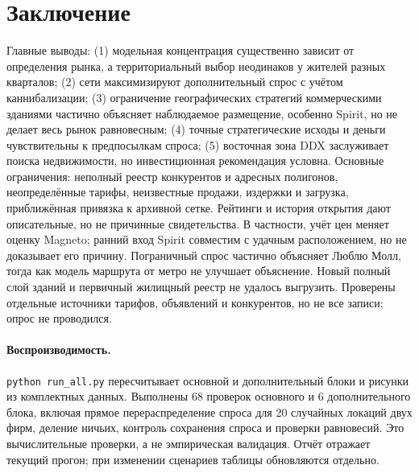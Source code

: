 \documentclass[12pt,a4paper]{article}
\begin{document}
\section{Заключение}
Главные выводы: (1) модельная концентрация существенно зависит от определения рынка, а территориальный выбор неодинаков у жителей разных кварталов; (2) сети максимизируют дополнительный спрос с учётом каннибализации; (3) ограничение географических стратегий коммерческими зданиями частично объясняет наблюдаемое размещение, особенно Spirit, но не делает весь рынок равновесным; (4) точные стратегические исходы и деньги чувствительны к предпосылкам спроса; (5) восточная зона DDX заслуживает поиска недвижимости, но инвестиционная рекомендация условна. Основные ограничения: неполный реестр конкурентов и адресных полигонов, неопределённые тарифы, неизвестные продажи, издержки и загрузка, приближённая привязка к архивной сетке. Рейтинги и история открытия дают описательные, но не причинные свидетельства. В частности, учёт цен меняет оценку Magneto; ранний вход Spirit совместим с удачным расположением, но не доказывает его причину. Пограничный спрос частично объясняет Люблю Молл, тогда как модель маршрута от метро не улучшает объяснение. Новый полный слой зданий и первичный жилищный реестр не удалось выгрузить. Проверены отдельные источники тарифов, объявлений и конкурентов, но не все записи; опрос не проводился.

\paragraph{Воспроизводимость.} \texttt{python run\_all.py} пересчитывает основной и дополнительный блоки и рисунки из комплектных данных. Выполнены 68 проверок основного и 6 дополнительного блока, включая прямое перераспределение спроса для 20 случайных локаций двух фирм, деление ничьих, контроль сохранения спроса и проверки равновесий. Это вычислительные проверки, а не эмпирическая валидация. Отчёт отражает текущий прогон; при изменении сценариев таблицы обновляются отдельно.
\end{document}

